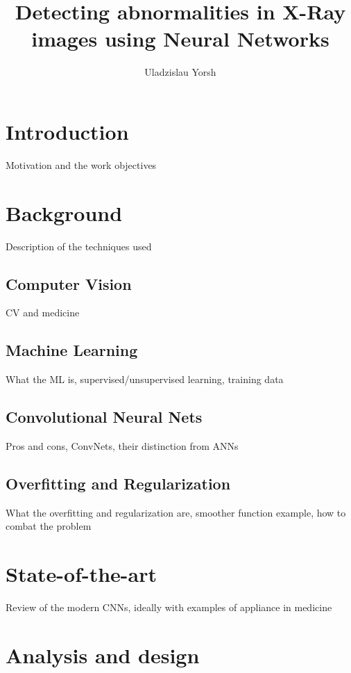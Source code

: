 \documentclass[thesis=B,english]{FITthesis}[2019/12/23]
\title{Detecting abnormalities in X-Ray images using Neural Networks}
\author{Uladzislau Yorsh} %
\begin{document}

\chapter{Introduction}

Motivation and the work objectives

\chapter{Background}

Description of the techniques used

\section{Computer Vision}

CV and medicine
	
\section{Machine Learning}

What the ML is, supervised/unsupervised learning, training data

\section{Convolutional Neural Nets}

Pros and cons, ConvNets, their distinction from ANNs

\section{Overfitting and Regularization}

What the overfitting and regularization are, smoother function example, how to combat the problem

\chapter{State-of-the-art}

Review of the modern CNNs, ideally with examples of appliance in medicine

\chapter{Analysis and design}
\end{document}
